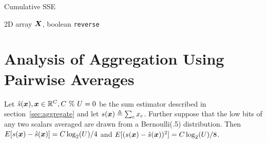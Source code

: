 \begin{algorithm}[h]
\caption{Cumulative SSE} \label{algo:cumSSE}
\begin{algorithmic}[1]
     2D array $\bm{X}$, boolean \texttt{reverse}
    \ENDIF


    \ENDFOR

        \ENDFOR
    \ENDFOR
\end{algorithmic}
\end{algorithm}

\vfill\break  %
\section{Analysis of Aggregation Using Pairwise Averages} \label{sec:aggregateAnalysis}


\begin{theorem}
Let $\hat{s}(\bm{x}), \bm{x} \in \mathbb{R}^C, C \text{ \% } U = 0$ be the sum estimator described in section~\ref{sec:aggregate} and let $s(\bm{x}) \triangleq \sum_c x_c$. Further suppose that the low bits of any two scalars averaged are drawn from a Bernoulli(.5) distribution. Then $E[s(\bm{x}) - \hat{s}(\bm{x})] = C \log_2(U) / 4$ and $E[(s(\bm{x}) - \hat{s}(\bm{x}))^2] = C \log_2(U) / 8$.
\end{theorem}

